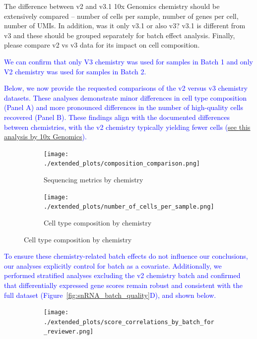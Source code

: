 \documentclass[12pt]{article}
\begin{document}
The difference between v2 and v3.1 10x Genomics chemistry should be extensively compared – number of cells per sample, number of genes per cell, number of UMIs. In addition, was it only v3.1 or also v3? v3.1 is different from v3 and these should be grouped separately for batch effect analysis. Finally, please compare v2 vs v3 data for its impact on cell composition.

\textcolor{blue}{We can confirm that only V3 chemistry was used for samples in Batch 1 and only V2 chemistry was used for samples in Batch 2.}

\textcolor{blue}{Below, we now provide the requested comparisons of the v2 versus v3 chemistry datasets. These analyses demonstrate minor differences in cell type composition (Panel A) and more pronounced differences in the number of high-quality cells recovered (Panel B). These findings align with the documented differences between chemistries, with the v2 chemistry typically yielding fewer cells (\href{https://kb.10xgenomics.com/hc/en-us/articles/360026501692-Do-we-see-a-difference-in-the-expression-profile-of-3-Single-Cell-v3-chemistry-compared-to-v2-chemistry}{see \underline{this analysis} by 10x Genomics}).}

\begin{figure}[H]
	\begin{subfigure}[t]{0.33\textwidth}
		\caption{Sequencing metrics by chemistry}
		\texttt{[image: ./extended\_plots/composition\_comparison.png]}        
	\end{subfigure} 
	\begin{subfigure}[t]{0.65\textwidth}
		\caption{Cell type composition by chemistry}
		\texttt{[image: ./extended\_plots/number\_of\_cells\_per\_sample.png]}        
	\end{subfigure} 
\end{figure}

\textcolor{blue}{To ensure these chemistry-related batch effects do not influence our conclusions, our analyses explicitly control for batch as a covariate. Additionally, we performed stratified analyses excluding the v2 chemistry batch and confirmed that differentially expressed gene scores remain robust and consistent with the full dataset (Figure~\ref{fig:snRNA_batch_quality}D), and shown below.}

\begin{figure}[H]
	\begin{subfigure}[t]{\textwidth}
	\texttt{[image: ./extended\_plots/score\_correlations\_by\_batch\_for\_reviewer.png]}        
	\end{subfigure}   
\end{figure}
\end{document}
